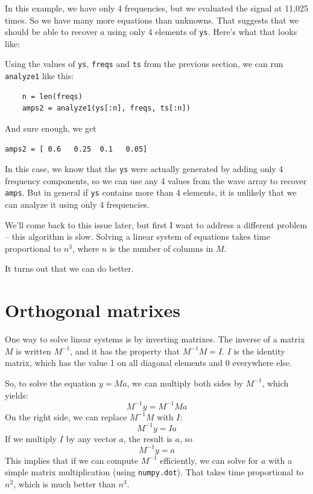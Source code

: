\documentclass[12pt]{book}
\begin{document}
In this example, we have only 4 frequencies, but we evaluated the
signal at 11,025 times.  So we have many more equations than unknowns.
That suggests that we should be able to recover $a$ using only
4 elements of {\tt ys}.  Here's what that looks like:

Using the values of {\tt ys}, {\tt freqs} and {\tt ts} from
the previous section, we can run {\tt analyze1} like this:

\begin{verbatim}
    n = len(freqs)
    amps2 = analyze1(ys[:n], freqs, ts[:n])
\end{verbatim}

And sure enough, we get

\begin{verbatim}
amps2 = [ 0.6   0.25  0.1   0.05]
\end{verbatim}

In this case, we know that the {\tt ys} were actually generated by
adding only 4 frequency components, so we can use any 4 values from
the wave array to recover {\tt amps}.  But in general if {\tt ys}
contains more than 4 elements, it is unlikely that we can analyze it
using only 4 frequencies.

We'll come back to this issue later, but first I want to address
a different problem -- this algorithm is slow.  Solving a linear
system of equations takes time proportional to $n^3$, where $n$ is
the number of columns in $M$.

It turns out that we can do better.


\section{Orthogonal matrixes}

One way to solve linear systems is by inverting matrixes.  The
inverse of a matrix $M$ is written $M^{-1}$, and it has the property
that $M^{-1}M = I$.  $I$ is the identity matrix, which has
the value 1 on all diagonal elements and 0 everywhere else.

So, to solve the equation $y = Ma$, we can multiply both sides by
$M^{-1}$, which yields:
%
\[ M^{-1}y = M^{-1} M a \]
%
On the right side, we can replace $M^{-1}M$ with $I$:
%
\[ M^{-1}y = I a \]
%
If we multiply $I$ by any vector $a$, the result is $a$, so  
%
\[ M^{-1}y = a \]
%
This implies that if we can compute $M^{-1}$ efficiently, we can solve
for $a$ with a simple matrix multiplication (using {\tt numpy.dot}).
That takes time proportional to $n^2$, which is much better than
$n^3$.
\end{document}
